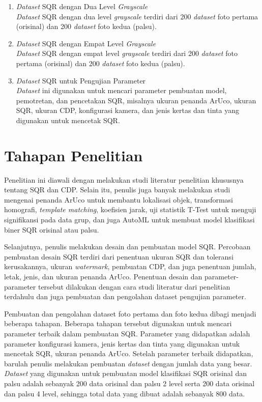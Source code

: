 \begin{enumerate}
	\item \emph{Dataset} SQR dengan Dua Level \emph{Grayscale}\\\emph{Dataset} SQR dengan dua level \emph{grayscale} terdiri dari 200 \emph{dataset} foto pertama (orisinal) dan 200 \emph{dataset} foto kedua (palsu).
	\item \emph{Dataset} SQR dengan Empat Level \emph{Grayscale}\\\emph{Dataset} SQR dengan empat level \emph{grayscale} terdiri dari 200 \emph{dataset} foto pertama (orisinal) dan 200 \emph{dataset} foto kedua (palsu).
	\item \emph{Dataset} SQR untuk Pengujian Parameter\\\emph{Dataset} ini digunakan untuk mencari parameter pembuatan model, pemotretan, dan pencetakan SQR, misalnya ukuran penanda ArUco, ukuran SQR, ukuran CDP, konfigurasi kamera, dan jenis kertas dan tinta yang digunakan untuk mencetak SQR.
\end{enumerate}

\section{Tahapan Penelitian}
Penelitian ini diawali dengan melakukan studi literatur penelitian khususnya tentang SQR dan CDP. Selain itu, penulis juga banyak melakukan studi mengenai
penanda ArUco untuk membantu lokalisasi objek, transformasi homografi, \emph{template matching}, koefisien jarak, uji statistik T-Test untuk menguji
signifikansi pada data grup, dan juga AutoML untuk membuat model klasifikasi biner SQR orisinal atau palsu.

Selanjutnya, penulis melakukan desain dan pembuatan model SQR. Percobaan pembuatan desain SQR terdiri dari penentuan ukuran SQR dan toleransi kerusakannya,
ukuran \emph{watermark}, pembuatan CDP, dan juga penentuan jumlah, letak, jenis, dan ukuran penanda ArUco. Penentuan desain dan parameter-parameter tersebut
dilakukan dengan cara studi literatur dari penelitian terdahulu dan juga pembuatan dan pengolahan dataset pengujian parameter.

Pembuatan dan pengolahan dataset foto pertama dan foto kedua dibagi menjadi beberapa tahapan. Beberapa tahapan tersebut digunakan untuk mencari parameter
terbaik dalam pembuatan SQR. Parameter yang didapatkan adalah parameter konfigurasi kamera, jenis kertas dan tinta yang digunakan untuk mencetak SQR, ukuran
penanda ArUco. Setelah parameter terbaik didapatkan, barulah penulis melakukan pembuatan \emph{dataset} dengan jumlah data yang besar. \emph{Dataset} yang
digunakan untuk pembuatan model klasifikasi SQR orisinal dan palsu adalah sebanyak 200 data orisinal dan palsu 2 level serta 200 data orisinal dan palsu 4
level, sehingga total data yang dibuat adalah sebanyak 800 data.

